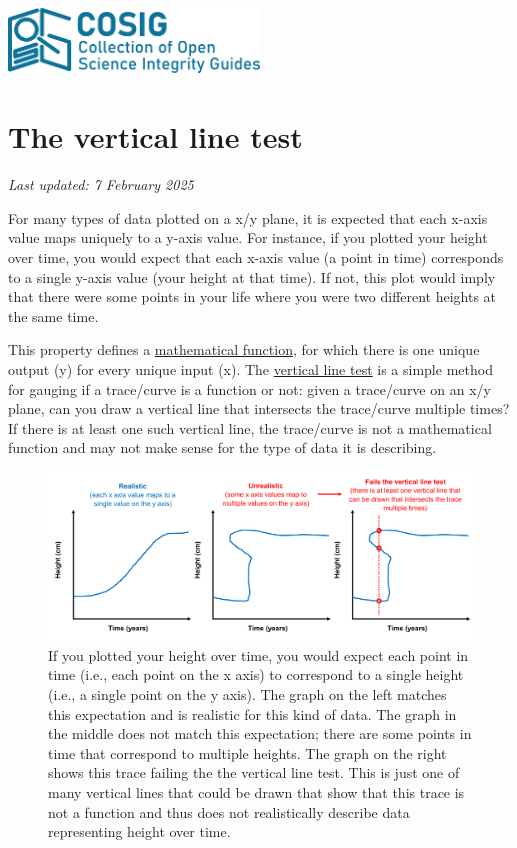 \documentclass[letterpaper, 12pt]{article}
\begin{document}
\flushleft
\includegraphics[width=0.5\textwidth]{img/home/241017_final_logo_mockup.png}

\section*{The vertical line test}
\textit{Last updated: 7 February 2025}

For many types of data plotted on a x/y plane, it is expected that each x-axis value maps uniquely to a y-axis value. For instance, if you plotted your height over time, you would expect that each x-axis value (a point in time) corresponds to a single y-axis value (your height at that time). If not, this plot would imply that there were some points in your life where you were two different heights at the same time.

This property defines a \href{https://en.wikipedia.org/wiki/Graph_of_a_function}{mathematical function}, for which there is one unique output (y) for every unique input (x). The \href{https://en.wikipedia.org/wiki/Vertical_line_test}{vertical line test} is a simple method for gauging if a trace/curve is a function or not: given a trace/curve on an x/y plane, can you draw a vertical line that intersects the trace/curve multiple times? If there is at least one such vertical line, the trace/curve is not a mathematical function and may not make sense for the type of data it is describing.

\begin{figure}[h!tbp]
    \centering
    \includegraphics[width=\textwidth]{img/vertical_line/vertical_line_test_mockup.png}
    \caption*{If you plotted your height over time, you would expect each point in time (i.e., each point on the x axis) to correspond to a single height (i.e., a single point on the y axis). The graph on the left matches this expectation and is realistic for this kind of data. The graph in the middle does not match this expectation; there are some points in time that correspond to multiple heights. The graph on the right shows this trace failing the the vertical line test. This is just one of many vertical lines that could be drawn that show that this trace is not a function and thus does not realistically describe data representing height over time.}
\end{figure}
\end{document}
